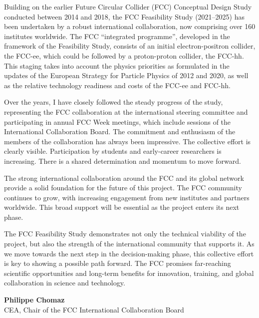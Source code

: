 Building on the earlier Future Circular Collider (FCC) Conceptual Design Study conducted between 2014 and 2018, the FCC Feasibility Study (2021–2025) has been undertaken by a robust international collaboration, now comprising over 160 institutes worldwide.  The FCC “integrated programme”, developed in the framework of the Feasibility Study, consists of an initial electron-positron collider, the FCC-ee, which could be followed by a proton-proton collider, the FCC-hh. This staging takes into account the physics priorities as formulated in the updates of the European Strategy for Particle Physics of 2012 and 2020, as well as the relative technology readiness and costs of the FCC-ee and FCC-hh.

Over the years, I have closely followed the steady progress of the study, representing the FCC collaboration at the international steering committee and participating in annual FCC Week meetings, which include sessions of the International Collaboration Board. The commitment and enthusiasm of the members of the collaboration has always been impressive. The collective effort is clearly visible. Participation by students and early-career researchers is increasing. There is a shared determination and momentum to move forward.

The strong international collaboration around the FCC and its global network provide a solid foundation for the future of this project. The FCC community continues to grow, with increasing engagement from new institutes and partners worldwide. This broad support will be essential as the project enters its next phase.

The FCC Feasibility Study demonstrates not only the technical viability of the project, but also the strength of the international community that supports it. As we move towards the next step in the decision-making phase, this collective effort is key to showing a possible path forward. The FCC promises far-reaching scientific opportunities and long-term benefits for innovation, training, and global collaboration in science and technology.

\begin{flushright}
\textbf{Philippe Chomaz}\\
CEA, Chair of the FCC International Collaboration Board
\end{flushright}